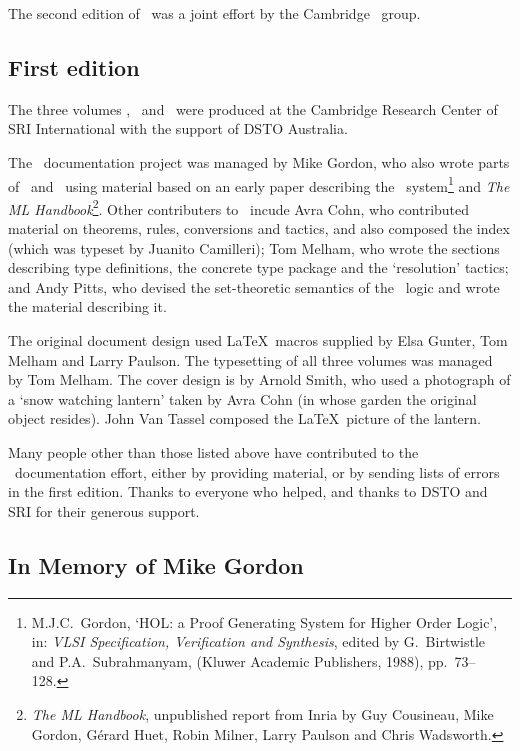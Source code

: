The second edition of \REFERENCE\ was a joint effort by the Cambridge
\HOL\ group.

\subsection*{First edition}

The three volumes \TUTORIAL, \DESCRIPTION\ and \REFERENCE\ were
produced at the Cambridge Research Center of SRI International with
the support of DSTO Australia.

The \HOL\ documentation project was managed by Mike Gordon, who also
wrote parts of \DESCRIPTION\ and \TUTORIAL\ using material based on an
early paper describing the \HOL\ system\footnote{M.J.C.\ Gordon, `HOL:
  a Proof Generating System for Higher Order Logic', in: {\it VLSI
    Specification, Verification and Synthesis\/}, edited by G.\
  Birtwistle and P.A.\ Subrahmanyam, (Kluwer Academic Publishers,
  1988), pp.\ 73--128.} and {\sl The ML Handbook\/}\footnote{{\sl The
    ML Handbook}, unpublished report from Inria by Guy Cousineau, Mike
  Gordon, G\'erard Huet, Robin Milner, Larry Paulson and Chris
  Wadsworth.}.  Other contributers to \DESCRIPTION\ incude Avra Cohn,
who contributed material on theorems, rules, conversions and tactics,
and also composed the index (which was typeset by Juanito Camilleri);
Tom Melham, who wrote the sections describing type definitions, the
concrete type package and the `resolution' tactics; and Andy Pitts,
who devised the set-theoretic semantics of the \HOL\ logic and wrote
the material describing it.

The original document design used \LaTeX\ macros supplied by Elsa
Gunter, Tom Melham and Larry Paulson.  The typesetting of all three
volumes was managed by Tom Melham.  The cover design is by Arnold
Smith, who used a photograph of a `snow watching lantern' taken by
Avra Cohn (in whose garden the original object resides).  John Van
Tassel composed the \LaTeX\ picture of the lantern.

Many people other than those listed above have contributed to the
\HOL\ documentation effort, either by providing material, or by
sending lists of errors in the first edition.  Thanks to everyone who
helped, and thanks to DSTO and SRI for their generous support.

\newpage
\subsection*{In Memory of Mike Gordon}

